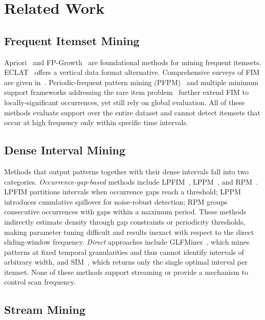 \section{Related Work}

\subsection{Frequent Itemset Mining}

Apriori~\cite{agrawal1994fast} and FP-Growth~\cite{han2000mining}
are foundational methods for mining frequent itemsets.
ECLAT~\cite{zaki1997new} offers a vertical data format alternative.
Comprehensive surveys of FIM are given in~\cite{fournier2017survey,luna2019fim,fournierviger2022survey}.
Periodic-frequent pattern mining (PFPM)~\cite{tanbeer2009pfpm} and
multiple minimum support frameworks addressing the rare item
problem~\cite{liu1999multiple} further extend FIM to locally-significant
occurrences, yet still rely on global evaluation.
All of these methods evaluate support over the entire dataset and
cannot detect itemsets that occur at high frequency only within
specific time intervals.

\subsection{Dense Interval Mining}

Methods that output patterns together with their dense intervals
fall into two categories.
\textit{Occurrence-gap-based} methods include
LPFIM~\cite{yin2014lpfim}, LPPM~\cite{saleh2011lppm}, and
RPM~\cite{kiran2017rpm}.
LPFIM partitions intervals when occurrence gaps reach a threshold;
LPPM introduces cumulative spillover for noise-robust detection;
RPM groups consecutive occurrences with gaps within a maximum period.
These methods indirectly estimate density through gap constraints
or periodicity thresholds, making parameter tuning difficult and
results inexact with respect to the direct sliding-window frequency.
\textit{Direct} approaches include GLFMiner~\cite{fournierviger2021glf},
which mines patterns at fixed temporal granularities and thus cannot
identify intervals of arbitrary width, and SIM~\cite{kiran2015sim},
which returns only the single optimal interval per itemset.
None of these methods support streaming or provide a mechanism
to control scan frequency.

\subsection{Stream Mining}

